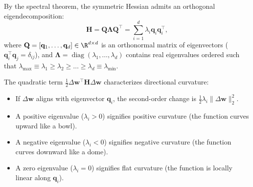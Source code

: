 By the spectral theorem, the symmetric Hessian admits an orthogonal eigendecomposition:
\begin{equation}
\mathbf{H} = \mathbf{Q} \mathbf{\Lambda} \mathbf{Q}^\top = \sum_{i=1}^d \lambda_i \mathbf{q}_i \mathbf{q}_i^\top,
\label{eq:hessian_spectral}
\end{equation}
where $\mathbf{Q} = [\mathbf{q}_1, \dots, \mathbf{q}_d] \in \R^{d \times d}$ is an orthonormal matrix of eigenvectors ($\mathbf{q}_i^\top \mathbf{q}_j = \delta_{ij}$), and $\mathbf{\Lambda} = \operatorname{diag}(\lambda_1, \dots, \lambda_d)$ contains real eigenvalues ordered such that $\lambda_{\max} \equiv \lambda_1 \ge \lambda_2 \ge \dots \ge \lambda_d \equiv \lambda_{\min}$.

The quadratic term $\frac{1}{2} \Delta \mathbf{w}^\top \mathbf{H} \Delta \mathbf{w}$ characterizes directional curvature:
\begin{itemize}[noitemsep]
  \item If $\Delta \mathbf{w}$ aligns with eigenvector $\mathbf{q}_i$, the second-order change is $\frac{1}{2} \lambda_i \|\Delta \mathbf{w}\|_2^2$.
  \item A positive eigenvalue ($\lambda_i > 0$) signifies positive curvature (the function curves upward like a bowl).
  \item A negative eigenvalue ($\lambda_i < 0$) signifies negative curvature (the function curves downward like a dome).
  \item A zero eigenvalue ($\lambda_i = 0$) signifies flat curvature (the function is locally linear along $\mathbf{q}_i$).
\end{itemize}

